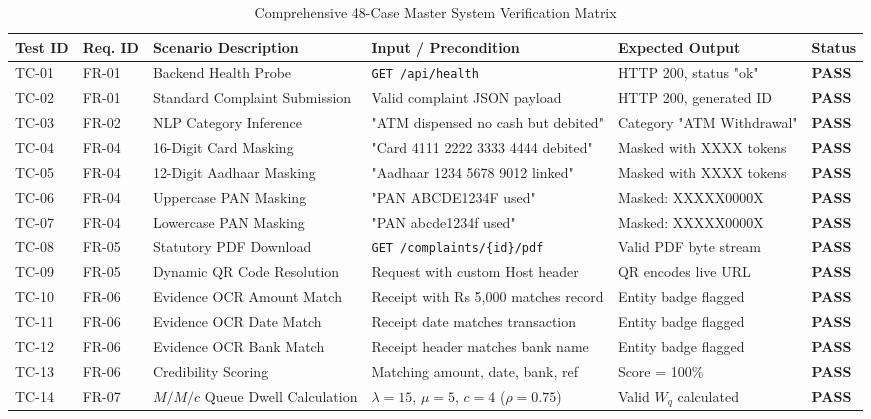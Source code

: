 \begin{table}[p]
\centering
\caption{Comprehensive 48-Case Master System Verification Matrix}
\label{tab:test_matrix}
\begin{tabular}{|p{1.2cm}|p{1.2cm}|p{3.8cm}|p{3.8cm}|p{2.8cm}|p{1.0cm}|}
\hline
\textbf{Test ID} & \textbf{Req. ID} & \textbf{Scenario Description} & \textbf{Input / Precondition} & \textbf{Expected Output} & \textbf{Status} \\ \hline
TC-01 & FR-01 & Backend Health Probe & \texttt{GET /api/health} & HTTP 200, status "ok" & \textbf{PASS} \\ \hline
TC-02 & FR-01 & Standard Complaint Submission & Valid complaint JSON payload & HTTP 200, generated ID & \textbf{PASS} \\ \hline
TC-03 & FR-02 & NLP Category Inference & "ATM dispensed no cash but debited" & Category "ATM Withdrawal" & \textbf{PASS} \\ \hline
TC-04 & FR-04 & 16-Digit Card Masking & "Card 4111 2222 3333 4444 debited" & Masked with XXXX tokens & \textbf{PASS} \\ \hline
TC-05 & FR-04 & 12-Digit Aadhaar Masking & "Aadhaar 1234 5678 9012 linked" & Masked with XXXX tokens & \textbf{PASS} \\ \hline
TC-06 & FR-04 & Uppercase PAN Masking & "PAN ABCDE1234F used" & Masked: XXXXX0000X & \textbf{PASS} \\ \hline
TC-07 & FR-04 & Lowercase PAN Masking & "PAN abcde1234f used" & Masked: XXXXX0000X & \textbf{PASS} \\ \hline
TC-08 & FR-05 & Statutory PDF Download & \texttt{GET /complaints/\{id\}/pdf} & Valid PDF byte stream & \textbf{PASS} \\ \hline
TC-09 & FR-05 & Dynamic QR Code Resolution & Request with custom Host header & QR encodes live URL & \textbf{PASS} \\ \hline
TC-10 & FR-06 & Evidence OCR Amount Match & Receipt with Rs 5,000 matches record & Entity badge flagged & \textbf{PASS} \\ \hline
TC-11 & FR-06 & Evidence OCR Date Match & Receipt date matches transaction & Entity badge flagged & \textbf{PASS} \\ \hline
TC-12 & FR-06 & Evidence OCR Bank Match & Receipt header matches bank name & Entity badge flagged & \textbf{PASS} \\ \hline
TC-13 & FR-06 & Credibility Scoring & Matching amount, date, bank, ref & Score = 100\% & \textbf{PASS} \\ \hline
TC-14 & FR-07 & $M/M/c$ Queue Dwell Calculation & $\lambda=15$, $\mu=5$, $c=4$ ($\rho=0.75$) & Valid $W_q$ calculated & \textbf{PASS} \\ \hline

\end{tabular}
\end{table}
